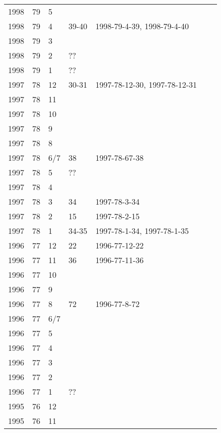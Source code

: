 \begin{longtable}{ |l|l|l|l|p{2.7cm}|l|p{2cm}| }
 1998 & 79 &     5 &         &  &  & \\
 1998 & 79 &     4 &   39-40 & 1998-79-4-39, 1998-79-4-40 &  & \\
 1998 & 79 &     3 &         &  &  & \\
 1998 & 79 &     2 &     ??  &  &  & \\
 1998 & 79 &     1 &     ??  &  &  & \\
 1997 & 78 &    12 &    30-31   & 1997-78-12-30, 1997-78-12-31  &  & \\
 1997 & 78 &    11 &         &  &  & \\
 1997 & 78 &    10 &         &  &  & \\
 1997 & 78 &     9 &         &  &  & \\
 1997 & 78 &     8 &         &  &  & \\
 1997 & 78 &   6/7 &    38   & 1997-78-67-38  &  & \\
 1997 & 78 &     5 &     ??  &  &  & \\
 1997 & 78 &     4 &         &  &  & \\
 1997 & 78 &     3 &    34   & 1997-78-3-34 &  & \\
 1997 & 78 &     2 &    15   & 1997-78-2-15  &  & \\
 1997 & 78 &     1 &   34-35 & 1997-78-1-34, 1997-78-1-35 &  & \\
 1996 & 77 &    12 &    22   & 1996-77-12-22 &  & \\
 1996 & 77 &    11 &    36   & 1996-77-11-36 &  & \\
 1996 & 77 &    10 &         &                &  & \\
 1996 & 77 &     9 &         &                &  & \\
 1996 & 77 &     8 &    72   & 1996-77-8-72 &  & \\
 1996 & 77 &   6/7 &         &                &  & \\
 1996 & 77 &     5 &         &                &  & \\
 1996 & 77 &     4 &         &                &  & \\
 1996 & 77 &     3 &         &                &  & \\
 1996 & 77 &     2 &         &                &  & \\
 1996 & 77 &     1 &     ??  &                &  & \\
 1995 & 76 &    12 &         &                &  & \\
 1995 & 76 &    11 &         &                &  & \\

\end{longtable}

